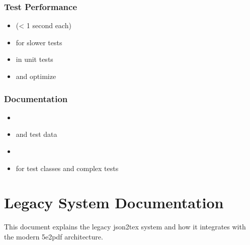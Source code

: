 \documentclass[letterpaper,10pt,english]{sphinxmanual}
\begin{document}
\subsubsection{Test Performance}
\label{\detokenize{developer/testing:test-performance}}\begin{itemize}
\item {} 
\sphinxAtStartPar
{} (\textless{} 1 second each)

\item {} 
\sphinxAtStartPar
{} for slower tests

\item {} 
\sphinxAtStartPar
{} in unit tests

\item {} 
\sphinxAtStartPar
{} and optimize

\end{itemize}


\subsubsection{Documentation}
\label{\detokenize{developer/testing:documentation}}\begin{itemize}
\item {} 
\sphinxAtStartPar
{}

\item {} 
\sphinxAtStartPar
{} and test data

\item {} 
\sphinxAtStartPar
{}

\item {} 
\sphinxAtStartPar
{} for test classes and complex tests

\end{itemize}

\sphinxstepscope


\section{Legacy System Documentation}
\label{\detokenize{developer/legacy:legacy-system-documentation}}\label{\detokenize{developer/legacy::doc}}
\sphinxAtStartPar
This document explains the legacy json2tex system and how it integrates with the modern 5e2pdf architecture.
\end{document}
